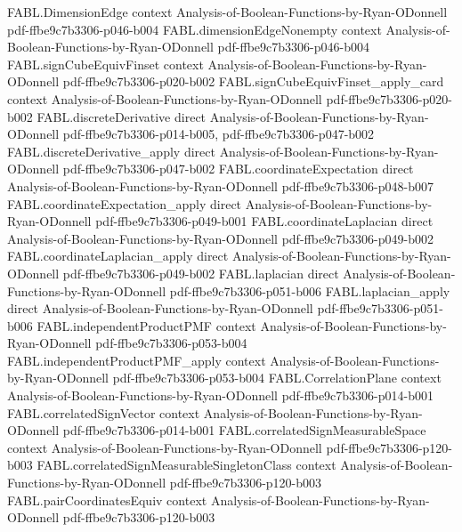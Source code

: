 \begin{theorem}
\proofstep
  {FABL.DimensionEdge}
  {context}
  {Analysis-of-Boolean-Functions-by-Ryan-ODonnell}
  {pdf-ffbe9c7b3306-p046-b004}
\proofstep
  {FABL.dimensionEdgeNonempty}
  {context}
  {Analysis-of-Boolean-Functions-by-Ryan-ODonnell}
  {pdf-ffbe9c7b3306-p046-b004}
\proofstep
  {FABL.signCubeEquivFinset}
  {context}
  {Analysis-of-Boolean-Functions-by-Ryan-ODonnell}
  {pdf-ffbe9c7b3306-p020-b002}
\proofstep
  {FABL.signCubeEquivFinset_apply_card}
  {context}
  {Analysis-of-Boolean-Functions-by-Ryan-ODonnell}
  {pdf-ffbe9c7b3306-p020-b002}
\proofstep
  {FABL.discreteDerivative}
  {direct}
  {Analysis-of-Boolean-Functions-by-Ryan-ODonnell}
  {pdf-ffbe9c7b3306-p014-b005,
    pdf-ffbe9c7b3306-p047-b002}
\proofstep
  {FABL.discreteDerivative_apply}
  {direct}
  {Analysis-of-Boolean-Functions-by-Ryan-ODonnell}
  {pdf-ffbe9c7b3306-p047-b002}
\proofstep
  {FABL.coordinateExpectation}
  {direct}
  {Analysis-of-Boolean-Functions-by-Ryan-ODonnell}
  {pdf-ffbe9c7b3306-p048-b007}
\proofstep
  {FABL.coordinateExpectation_apply}
  {direct}
  {Analysis-of-Boolean-Functions-by-Ryan-ODonnell}
  {pdf-ffbe9c7b3306-p049-b001}
\proofstep
  {FABL.coordinateLaplacian}
  {direct}
  {Analysis-of-Boolean-Functions-by-Ryan-ODonnell}
  {pdf-ffbe9c7b3306-p049-b002}
\proofstep
  {FABL.coordinateLaplacian_apply}
  {direct}
  {Analysis-of-Boolean-Functions-by-Ryan-ODonnell}
  {pdf-ffbe9c7b3306-p049-b002}
\proofstep
  {FABL.laplacian}
  {direct}
  {Analysis-of-Boolean-Functions-by-Ryan-ODonnell}
  {pdf-ffbe9c7b3306-p051-b006}
\proofstep
  {FABL.laplacian_apply}
  {direct}
  {Analysis-of-Boolean-Functions-by-Ryan-ODonnell}
  {pdf-ffbe9c7b3306-p051-b006}
\proofstep
  {FABL.independentProductPMF}
  {context}
  {Analysis-of-Boolean-Functions-by-Ryan-ODonnell}
  {pdf-ffbe9c7b3306-p053-b004}
\proofstep
  {FABL.independentProductPMF_apply}
  {context}
  {Analysis-of-Boolean-Functions-by-Ryan-ODonnell}
  {pdf-ffbe9c7b3306-p053-b004}
\proofstep
  {FABL.CorrelationPlane}
  {context}
  {Analysis-of-Boolean-Functions-by-Ryan-ODonnell}
  {pdf-ffbe9c7b3306-p014-b001}
\proofstep
  {FABL.correlatedSignVector}
  {context}
  {Analysis-of-Boolean-Functions-by-Ryan-ODonnell}
  {pdf-ffbe9c7b3306-p014-b001}
\proofstep
  {FABL.correlatedSignMeasurableSpace}
  {context}
  {Analysis-of-Boolean-Functions-by-Ryan-ODonnell}
  {pdf-ffbe9c7b3306-p120-b003}
\proofstep
  {FABL.correlatedSignMeasurableSingletonClass}
  {context}
  {Analysis-of-Boolean-Functions-by-Ryan-ODonnell}
  {pdf-ffbe9c7b3306-p120-b003}
\proofstep
  {FABL.pairCoordinatesEquiv}
  {context}
  {Analysis-of-Boolean-Functions-by-Ryan-ODonnell}
  {pdf-ffbe9c7b3306-p120-b003}

\end{theorem}

